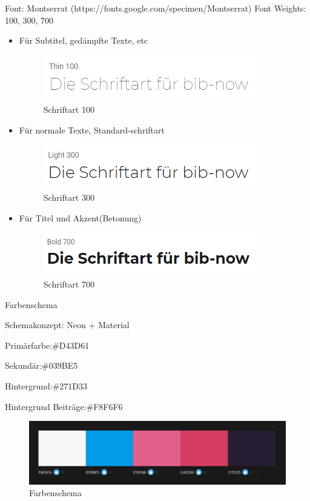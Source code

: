\documentclass[12pt,titlepage]{article}
\begin{document}
Font: Montserrat (https://fonts.google.com/specimen/Montserrat)
Font Weights: 100, 300, 700
\vspace{2cm}
\begin{itemize}
\item
	Für Subtitel, gedämpfte Texte, etc

\begin{figure}[hbt!]
\includegraphics{images/Schriftart_100.png}
\caption{Schriftart 100}
\end{figure}
\item
	Für normale Texte, Standard-schriftart

\begin{figure}[hbt!]
\includegraphics{images/Schriftart_300.png}
\caption{Schriftart 300}
\end{figure}
\item
	Für Titel und Akzent(Betonung)

\begin{figure}[hbt!]
\includegraphics{images/Schriftart_700.png}
\caption{Schriftart 700}
\end{figure}
\end{itemize}


Farbenschema

Schemakonzept: Neon + Material

Primärfarbe:\#D43D61

Sekundär:\#039BE5

Hintergrund:\#271D33

Hintergrund Beiträge:\#F8F6F6

\begin{figure}[hbt!]
\centering
\includegraphics[width=400pt]{images/Schema_1.png}
\caption{Farbenschema}
\end{figure}
\end{document}
